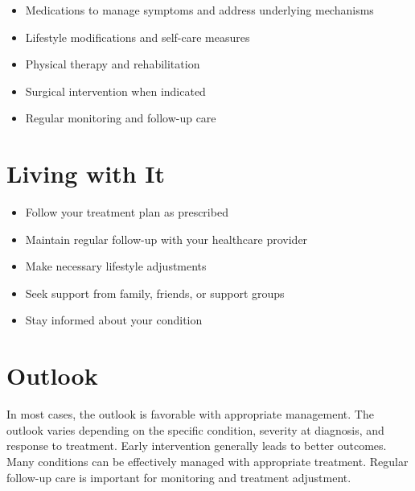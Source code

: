 \begin{itemize}[noitemsep]
  \item Medications to manage symptoms and address underlying mechanisms
  \item Lifestyle modifications and self-care measures
  \item Physical therapy and rehabilitation
  \item Surgical intervention when indicated
  \item Regular monitoring and follow-up care
\end{itemize}
\section{Living with It}
\begin{itemize}[noitemsep]
  \item Follow your treatment plan as prescribed
  \item Maintain regular follow-up with your healthcare provider
  \item Make necessary lifestyle adjustments
  \item Seek support from family, friends, or support groups
  \item Stay informed about your condition
\end{itemize}
\section{Outlook}
In most cases, the outlook is favorable with appropriate management. The outlook varies depending on the specific condition, severity at diagnosis, and response to treatment. Early intervention generally leads to better outcomes. Many conditions can be effectively managed with appropriate treatment. Regular follow-up care is important for monitoring and treatment adjustment.

